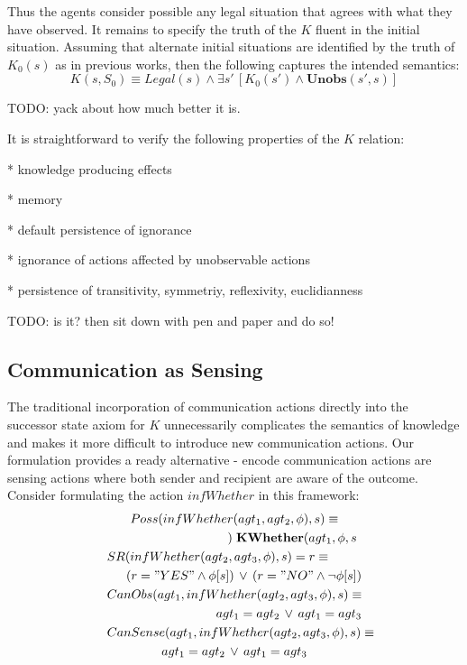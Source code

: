 \documentclass[letterpaper]{article}
\begin{document}
Thus the agents consider possible any legal situation that agrees
with what they have observed. It remains to specify the truth of the
$K$ fluent in the initial situation. Assuming that alternate initial
situations are identified by the truth of $K_{0}(s)$ as in previous
works, then the following captures the intended semantics:
\begin{equation}
K(s,S_{0})\equiv Legal(s)\wedge\exists s'\,\left[K_{0}(s')\wedge\mathbf{Unobs}(s',s)\right]
\end{equation}


TODO: yack about how much better it is.

It is straightforward to verify the following properties of the $K$
relation:

{*} knowledge producing effects

{*} memory

{*} default persistence of ignorance

{*} ignorance of actions affected by unobservable actions

{*} persistence of transitivity, symmetriy, reflexivity, euclidianness

TODO: is it? then sit down with pen and paper and do so!


\subsection{Communication as Sensing}

The traditional incorporation of communication actions directly into
the successor state axiom for $K$ unnecessarily complicates the semantics
of knowledge and makes it more difficult to introduce new communication
actions. Our formulation provides a ready alternative - encode communication
actions are sensing actions where both sender and recipient are aware
of the outcome. Consider formulating the action $infWhether$ in
this framework:
\begin{multline}
Poss(infWhether(agt_{1},agt_{2},\phi),s)\equiv\\
\shoveright{\mathbf{KWhether}(agt_{1},\phi,s})\\
\shoveleft{SR(infWhether(agt_{2},agt_{3},\phi),s)=r\equiv}\\
\shoveright{(r="YES"\wedge\phi[s])\,\vee\,(r="NO"\wedge\neg\phi[s])}\\
\shoveleft{CanObs(agt_{1},infWhether(agt_{2},agt_{3},\phi),s)\equiv}\\
\shoveright{agt_{1}=agt_{2}\,\vee\, agt_{1}=agt_{3}}\\
\shoveleft{CanSense(agt_{1},infWhether(agt_{2},agt_{3},\phi),s)\equiv}\\
agt_{1}=agt_{2}\,\vee\, agt_{1}=agt_{3}
\end{multline}
\end{document}
